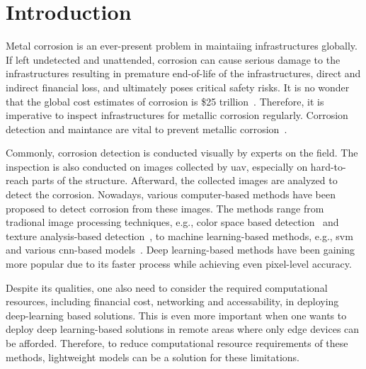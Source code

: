 \documentclass[mathematics,article,submit,pdftex,moreauthors]{Definitions/mdpi}
\begin{document}
\section{Introduction}

Metal corrosion is an ever-present problem in maintaiing 
infrastructures globally. If left undetected
and unattended, corrosion can cause serious damage to the infrastructures
resulting in premature end-of-life of the infrastructures,
direct and indirect financial loss, 
and ultimately poses critical safety risks. It 
is no wonder that the global cost estimates of
corrosion is \$25 trillion~\cite{Koch2016}.
Therefore, it is imperative to
inspect infrastructures for metallic corrosion
regularly. Corrosion detection and maintance
are vital to prevent metallic corrosion~\cite{Wang2019}.

Commonly, corrosion detection is conducted 
visually by experts on the field. The inspection is 
also conducted on images collected by \ac{uav}, especially
on hard-to-reach parts of the structure.
Afterward, the collected images are analyzed to detect
the corrosion. Nowadays, various computer-based
methods have been proposed to detect corrosion
from these images. The methods range from
tradional image processing techniques,
e.g., color space based detection~\cite{Igoe2016} 
and texture analysis-based detection~\cite{Pascual2014},
to machine learning-based methods, e.g.,
\ac{svm}~\cite{Chen2012} and various 
\ac{cnn}-based models~\cite{Nash2022, Liu2023}.
Deep learning-based methods have been gaining more
popular due to its faster process while achieving
even pixel-level accuracy. 

Despite its qualities, one also need to consider
the required computational resources, including
financial cost, networking and accessability,
in deploying deep-learning based solutions.
This is even more important when one wants to 
deploy deep learning-based solutions in remote
areas where only edge devices can be afforded.
Therefore, to reduce computational resource requirements
of these methods, lightweight 
models can be a solution for these limitations.
\end{document}
